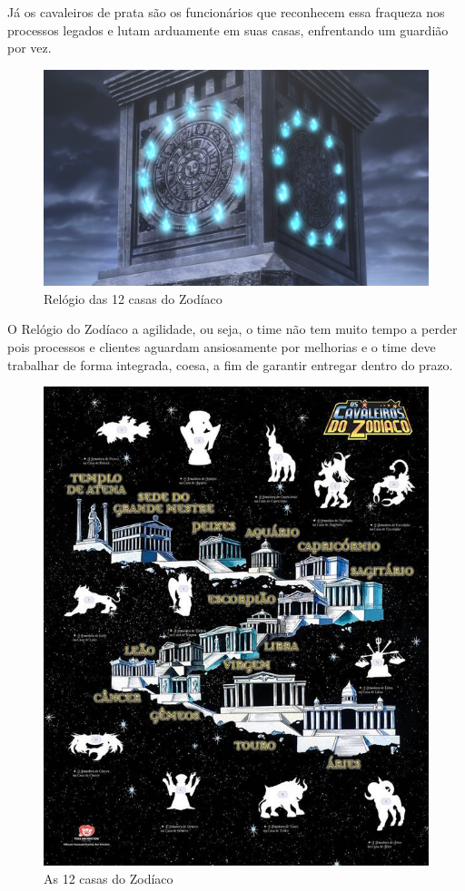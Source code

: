 \documentclass[a4paper]{article}
\begin{document}
Já os cavaleiros de prata são os funcionários que reconhecem essa fraqueza nos processos legados e lutam arduamente em suas casas, enfrentando um guardião por vez.

\begin{figure}[H]
    \centering
    \includegraphics[scale=0.35,keepaspectratio=true]{images/07.png}
    \caption{Relógio das 12 casas do Zodíaco}
\end{figure}

O Relógio do Zodíaco a agilidade, ou seja, o time não tem muito tempo a perder pois processos e clientes aguardam ansiosamente por melhorias e o time deve trabalhar de forma integrada, coesa, a fim de garantir entregar dentro do prazo.

\begin{figure}[H]
    \centering
    \includegraphics[scale=0.55,keepaspectratio=true]{images/08.jpg}
    \caption{As 12 casas do Zodíaco}
\end{figure}
\end{document}

